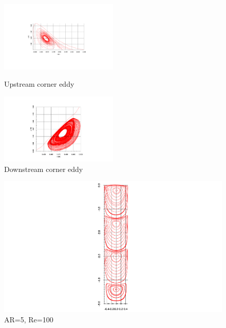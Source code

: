\documentclass[twocolumn,10pt]{asme2ej}
\begin{document}
\begin{figure}[tbh]
\begin{center}
\includegraphics[width=0.5\textwidth]{figure/leftVortex.pdf}
\caption{Upstream corner eddy}
\includegraphics[width=0.5\textwidth]{figure/rightVortex.pdf}
\caption{Downstream corner eddy}
\label{velocity_profile}
\end{center}
\end{figure}

\begin{figure}[tbh]
\begin{center}
\includegraphics[height=1.4\textwidth]{figure/AR5-Re100 streamFunction axis final.pdf}
\caption{AR=5, Re=100}
\label{}
\end{center}
\end{figure}
\end{document}
